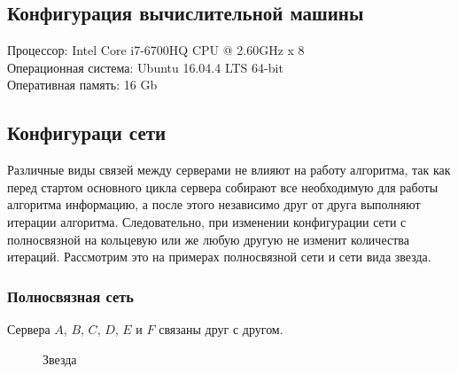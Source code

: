 		\subsection{Конфигурация вычислительной машины}
			Процессор: Intel Core i7-6700HQ CPU @ 2.60GHz x 8 \\
			Операционная система: Ubuntu 16.04.4 LTS 64-bit \\
			Оперативная память: 16 Gb


		\subsection{Конфигураци сети}	
			Различные виды связей между серверами не влияют на работу алгоритма, так как перед стартом основного цикла сервера собирают все необходимую для работы алгоритма информацию, а после 
			этого независимо друг от друга выполняют итерации алгоритма. Следовательно, при изменении конфигурации сети с полносвязной на кольцевую или же любую другую не изменит количества 
			итераций. Рассмотрим это на примерах полносвязной сети и сети вида звезда.

			\subsubsection{Полносвязная сеть} 
				Сервера $A$, $B$, $C$, $D$, $E$ и $F$ связаны друг с другом. 
				\begin{figure}[H] 
					\centering 
					\caption{Звезда} 
				\end{figure} 

